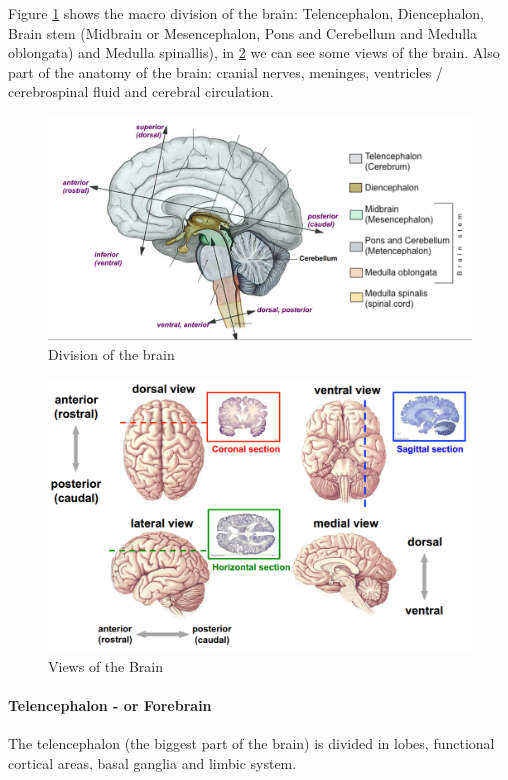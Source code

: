 \documentclass[12pt,article,oneside,a4paper]{memoir}
\begin{document}
Figure \ref{fig:brain} shows the macro division of the brain: Telencephalon, Diencephalon, Brain stem (Midbrain or Mesencephalon, Pons and Cerebellum and Medulla oblongata) and Medulla spinallis), in \ref{fig:brain2} we can see some views of the brain.
Also part of the anatomy of the brain: cranial nerves, meninges, ventricles / cerebrospinal fluid and cerebral circulation.

\begin{figure}
  \includegraphics[width=\linewidth]{imgs/viewsOfTheBrain.png}
  \caption{Division of the brain}
  \label{fig:brain}
\end{figure}

\begin{figure}
  \includegraphics[width=\linewidth]{imgs/viewsOfTheBrain2.png}
  \caption{Views of the Brain}
  \label{fig:brain2}
\end{figure}

\paragraph{Telencephalon - or Forebrain}
The telencephalon (the biggest part of the brain) is divided in lobes, functional cortical areas, basal ganglia and limbic system.
\end{document}
